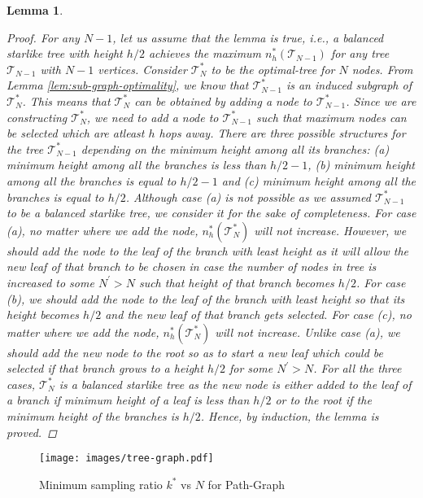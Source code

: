 \documentclass[letterpaper]{article} \usepackage{aaai20}  \usepackage{times}  \usepackage{helvet} \usepackage{courier}  \usepackage[hyphens]{url}  \usepackage{graphicx} \urlstyle{rm} \def\UrlFont{\rm}  \usepackage{graphicx}  \frenchspacing  \setlength{\pdfpagewidth}{8.5in}  \setlength{\pdfpageheight}{11in}
\newtheorem{lemma}{Lemma}
\begin{document}
\begin{lemma}
\begin{proof}
			 For any $N-1$, let us assume that the lemma is true, i.e., a balanced starlike tree with height $h/2$ achieves the maximum $n^{*}_{h}(\mathcal{T}_{N-1})$ for any tree $\mathcal{T}_{N-1}$ with $N-1$ vertices. Consider $\mathcal{T}^{*}_{N}$ to be the optimal-tree for $N$ nodes. From Lemma \eqref{lem:sub-graph-optimality}, we know that $\mathcal{T}^{*}_{N-1}$ is an induced subgraph of $\mathcal{T}^{*}_{N}$. This means that $\mathcal{T}^{*}_{N}$ can be obtained by adding a node to $\mathcal{T}^{*}_{N-1}$. Since we are constructing $\mathcal{T}^{*}_{N}$, we need to add a node to $\mathcal{T}^{*}_{N-1}$ such that maximum nodes can be selected which are atleast $h$ hops away. There are three possible structures for the tree $\mathcal{T}^{*}_{N-1}$ depending on the minimum height among all its branches: (a) minimum height among all the branches is less than $h/2-1$, (b) minimum height among all the branches is equal to $h/2-1$ and (c) minimum height among all the branches is equal to $h/2$. Although case (a) is not possible as we assumed $\mathcal{T}^{*}_{N-1}$ to be a balanced starlike tree, we consider it for the sake of completeness. For case (a), no matter where we add the node, $n^{*}_{h}(\mathcal{T}^{*}_{N})$ will not increase. However, we should add the node to the leaf of the branch with least height as it will allow the new leaf of that branch to be chosen in case the number of nodes in tree is increased to some $N^{'}>N$ such that height of that branch becomes $h/2$. For case (b), we should add the node to the leaf of the branch with least height so that its height becomes $h/2$ and the new leaf of that branch gets selected. For case (c), no matter where we add the node, $n^{*}_{h}(\mathcal{T}^{*}_{N})$ will not increase. Unlike case (a), we should add the new node to the root so as to start a new leaf which could be selected if that branch grows to a height $h/2$ for some $N^{'}>N$. For all the three cases, $\mathcal{T}^{*}_{N}$ is a balanced starlike tree as the new node is either added to the leaf of a branch if minimum height of a leaf is less than $h/2$ or to the root if the minimum height of the branches is $h/2$. Hence, by induction, the lemma is proved.


		\end{proof}
	\end{lemma}


	\begin{figure}[!ht]
	\centering
	\texttt{[image: images/tree-graph.pdf]}
	\caption{\label{fig:tree-graph} Minimum sampling ratio $k^{*}$ vs $N$ for Path-Graph}
	\end{figure}
\end{document}
